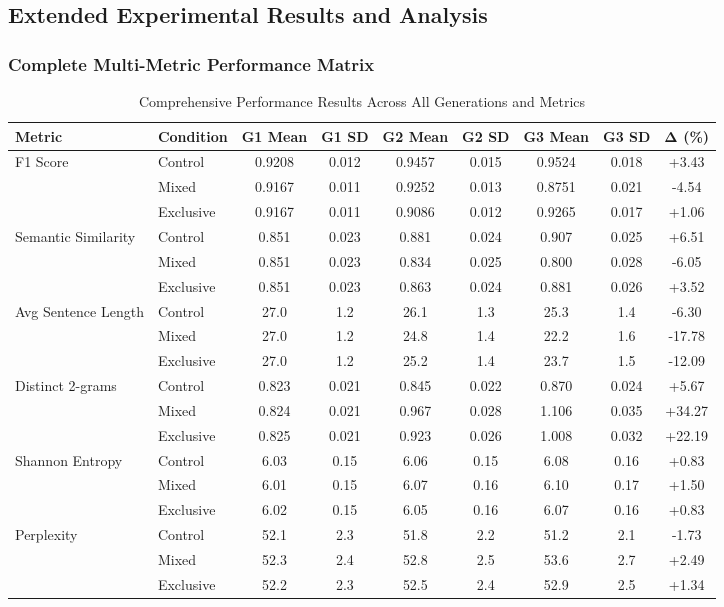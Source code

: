 \documentclass{article}
\begin{document}
\subsection{Extended Experimental Results and Analysis}
\label{appendix:extended_results}

\subsubsection{Complete Multi-Metric Performance Matrix}

\begin{table}[H]
\centering
\caption{Comprehensive Performance Results Across All Generations and Metrics}
\label{tab:complete_performance_matrix}
\scriptsize
\begin{tabular}{llccccccc}
\toprule
\textbf{Metric} & \textbf{Condition} & \textbf{G1 Mean} & \textbf{G1 SD} & \textbf{G2 Mean} & \textbf{G2 SD} & \textbf{G3 Mean} & \textbf{G3 SD} & \textbf{Δ (\%)} \\
\midrule
\multirow{3}{*}{F1 Score} 
& Control & 0.9208 & 0.012 & 0.9457 & 0.015 & 0.9524 & 0.018 & +3.43 \\
& Mixed & 0.9167 & 0.011 & 0.9252 & 0.013 & 0.8751 & 0.021 & -4.54 \\
& Exclusive & 0.9167 & 0.011 & 0.9086 & 0.012 & 0.9265 & 0.017 & +1.06 \\
\midrule
\multirow{3}{*}{Semantic Similarity} 
& Control & 0.851 & 0.023 & 0.881 & 0.024 & 0.907 & 0.025 & +6.51 \\
& Mixed & 0.851 & 0.023 & 0.834 & 0.025 & 0.800 & 0.028 & -6.05 \\
& Exclusive & 0.851 & 0.023 & 0.863 & 0.024 & 0.881 & 0.026 & +3.52 \\
\midrule
\multirow{3}{*}{Avg Sentence Length} 
& Control & 27.0 & 1.2 & 26.1 & 1.3 & 25.3 & 1.4 & -6.30 \\
& Mixed & 27.0 & 1.2 & 24.8 & 1.4 & 22.2 & 1.6 & -17.78 \\
& Exclusive & 27.0 & 1.2 & 25.2 & 1.4 & 23.7 & 1.5 & -12.09 \\
\midrule
\multirow{3}{*}{Distinct 2-grams} 
& Control & 0.823 & 0.021 & 0.845 & 0.022 & 0.870 & 0.024 & +5.67 \\
& Mixed & 0.824 & 0.021 & 0.967 & 0.028 & 1.106 & 0.035 & +34.27 \\
& Exclusive & 0.825 & 0.021 & 0.923 & 0.026 & 1.008 & 0.032 & +22.19 \\
\midrule
\multirow{3}{*}{Shannon Entropy} 
& Control & 6.03 & 0.15 & 6.06 & 0.15 & 6.08 & 0.16 & +0.83 \\
& Mixed & 6.01 & 0.15 & 6.07 & 0.16 & 6.10 & 0.17 & +1.50 \\
& Exclusive & 6.02 & 0.15 & 6.05 & 0.16 & 6.07 & 0.16 & +0.83 \\
\midrule
\multirow{3}{*}{Perplexity} 
& Control & 52.1 & 2.3 & 51.8 & 2.2 & 51.2 & 2.1 & -1.73 \\
& Mixed & 52.3 & 2.4 & 52.8 & 2.5 & 53.6 & 2.7 & +2.49 \\
& Exclusive & 52.2 & 2.3 & 52.5 & 2.4 & 52.9 & 2.5 & +1.34 \\
\bottomrule
\end{tabular}
\end{table}
\end{document}
